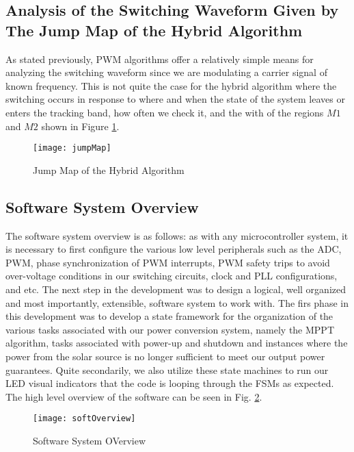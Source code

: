 \subsection{Analysis of the Switching Waveform Given by The Jump Map of the Hybrid Algorithm}
As stated previously, PWM algorithms offer a relatively simple means for analyzing the switching waveform since we are modulating a carrier signal of known frequency. This is not quite the case for the hybrid algorithm where the switching occurs in response to where and when the state of the system leaves or enters the tracking band, how often we check it, and the with of the regions $M1$ and $M2$ shown in Figure \ref{jump}.

\begin{figure}[htbp]
\begin{center}
\texttt{[image: jumpMap]}
\caption{Jump Map of the Hybrid Algorithm \cite{ricardo}}
\label{jump}
\end{center}
\end{figure}

\subsection{Software System Overview}
\label{softOver}
The software system overview is as follows: as with any microcontroller system, it is necessary to first configure the various low level peripherals such as the ADC, PWM, phase synchronization of PWM interrupts, PWM safety trips to avoid over-voltage conditions in our switching circuits, clock and PLL configurations, and etc. The next step in the development was to design a logical, well organized and most importantly, extensible, software system to work with. The firs phase in this development was to develop a state framework for the organization of the various tasks associated with our power conversion system, namely the MPPT algorithm, tasks associated with power-up and shutdown and instances where the power from the solar source is no longer sufficient to meet our output power guarantees. Quite secondarily, we also utilize these state machines to run our LED visual indicators that the code is looping through the FSMs as expected. The high level overview of the software can be seen in Fig. \ref{soft}.

\begin{figure}[htp]
\begin{center}
\texttt{[image: softOverview]}
\caption{Software System OVerview}
\label{soft}
\end{center}
\end{figure}

